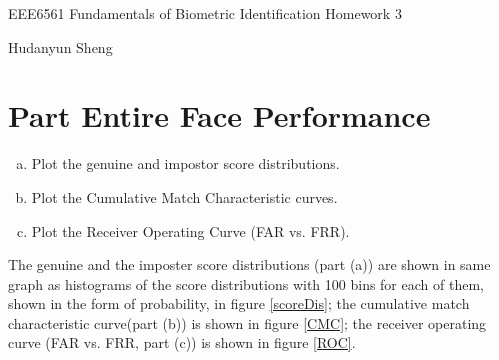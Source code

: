 \documentclass[a4paper]{article}
\begin{document}
\begin{spacing}{2.0}
\begin{flushleft}\begin{huge}EEE6561  Fundamentals of Biometric Identification   Homework 3\end{huge}
\end{flushleft}
\begin{flushright}\begin{Large}Hudanyun Sheng\end{Large}\end{flushright}
\section*{\huge\textbf{ Part \uppercase\expandafter{} Entire Face Performance}  }
	\normalsize
	\begin{enumerate}[(a)]
	\item Plot the genuine and impostor score distributions.
	\item Plot the Cumulative Match Characteristic curves.
	\item Plot the Receiver Operating Curve (FAR vs. FRR).
	\end{enumerate}
	
	The genuine and the imposter score distributions (part (a)) are shown in same graph as histograms of 	the  score distributions with 100 bins for each of them, shown in the form of probability, in figure 		\ref{scoreDis}; the cumulative match characteristic curve(part (b)) is shown in figure \ref{CMC}; the 		receiver operating curve (FAR vs. FRR, part (c)) is shown in figure \ref{ROC}.
	

\end{spacing}
\end{document}

